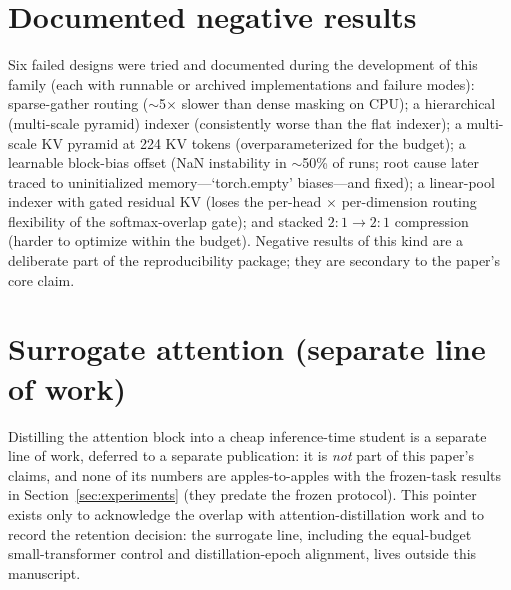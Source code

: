 \section{Documented negative results}
\label{sec:appendix-negatives}
Six failed designs were tried and documented during the development of this
family (each with runnable or archived implementations and failure modes):
sparse-gather routing ($\sim$5$\times$ slower than dense masking on CPU);
a hierarchical (multi-scale pyramid) indexer (consistently worse than the
flat indexer); a multi-scale KV pyramid at 224 KV tokens
(overparameterized for the budget); a learnable block-bias offset (NaN
instability in $\sim$50\% of runs; root cause later traced to uninitialized
memory---`torch.empty' biases---and fixed); a linear-pool indexer with
gated residual KV (loses the per-head $\times$ per-dimension routing
flexibility of the softmax-overlap gate); and stacked $2{:}1 \rightarrow
2{:}1$ compression (harder to optimize within the budget). Negative results
of this kind are a deliberate part of the reproducibility package; they are
secondary to the paper's core claim.

\section{Surrogate attention (separate line of work)}
\label{sec:appendix-surrogate}
Distilling the attention block into a cheap inference-time student is a separate
line of work, deferred to a separate publication: it is \emph{not} part of this
paper's claims, and none of its numbers are apples-to-apples with the frozen-task
results in Section~\ref{sec:experiments} (they predate the frozen protocol). This
pointer exists only to acknowledge the overlap with attention-distillation work
\citep{goldstein2025radlads} and to record the retention decision: the surrogate
line, including the equal-budget small-transformer control and
distillation-epoch alignment, lives outside this manuscript.

